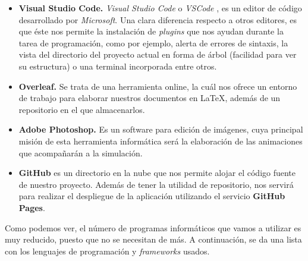 \documentclass[../main.tex]{subfiles}
\begin{document}
\begin{itemize}
    \item \textbf{Visual Studio Code. } \textit{Visual Studio Code} o \textit{VSCode} \cite{vsCode}, es un editor de código desarrollado por \textit{Microsoft}. Una clara diferencia respecto a otros editores, es que éste nos permite la instalación de \textit{plugins} que nos ayudan durante la tarea de programación, como por ejemplo, alerta de errores de sintaxis, la vista del directorio del proyecto actual en forma de árbol (facilidad para ver su estructura) o una terminal incorporada entre otros.
    \item \textbf{Overleaf. }Se trata de una herramienta online, la cuál nos ofrece un entorno de trabajo para elaborar nuestros documentos en \LaTeX, además de un repositorio en el que almacenarlos.
    \item \textbf{Adobe Photoshop. }Es un software para edición de imágenes, cuya principal misión de esta herramienta informática será la elaboración de las animaciones que acompañarán a la simulación.
    \item \textbf{GitHub} es un directorio en la nube que nos permite alojar el código fuente de nuestro proyecto. Además de tener la utilidad de repositorio, nos servirá para realizar el despliegue de la aplicación utilizando el servicio \textbf{GitHub Pages}. 
\end{itemize}

Como podemos ver, el número de programas informáticos que vamos a utilizar es muy reducido, puesto que no se necesitan de más. A continuación, se da una lista con los lenguajes de programación y \textit{frameworks} usados.
\end{document}

